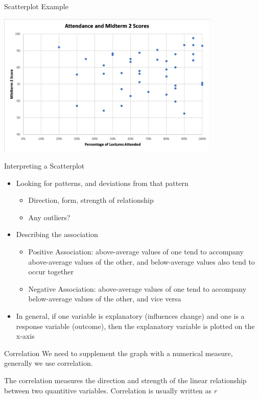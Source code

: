 \documentclass{beamer}
\begin{document}
\begin{frame}{Scatterplot Example}
	\begin{center}
		\includegraphics[width=0.8\textwidth]{midtermscatter}
	\end{center}
\end{frame}

\begin{frame}{Interpreting a Scatterplot}
	\begin{itemize}
		\item Looking for patterns, and deviations from that pattern
		      \begin{itemize}
		      	\item Direction, form, strength of relationship
		      	\item Any outliers?
		      \end{itemize}
		\item Describing the association
		      \begin{itemize}
		      	\item \alert{Positive Association}: above-average values of one tend to accompany above-average values of the other, and below-average values also tend to occur together
		      	\item \alert{Negative Association}: above-average values of one tend to accompany below-average values of the other, and vice versa
		      \end{itemize}
		\item In general, if one variable is explanatory (influences change) and one is a response variable (outcome), then the explanatory variable is plotted on the x-axis
	\end{itemize}
\end{frame}

\begin{frame}{Correlation}
	We need to supplement the graph with a numerical measure, generally we use \alert{correlation}.
	
	
	
	\begin{definition}[Correlation]
		The correlation measures the direction and strength of the linear relationship between two quantitive variables. Correlation is usually written as $r$
	\end{definition}
\end{frame}
\end{document}
